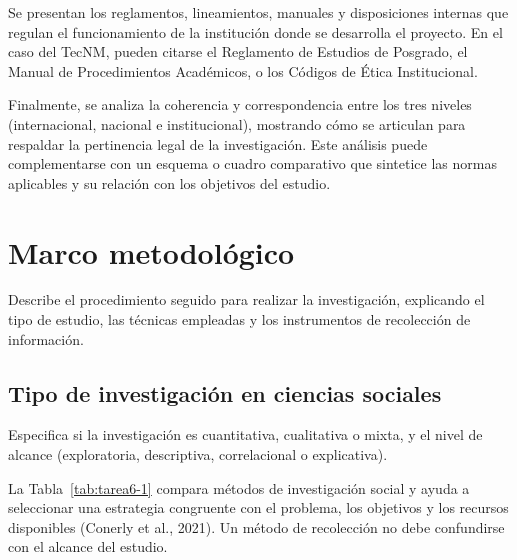Se presentan los reglamentos, lineamientos, manuales y disposiciones internas que regulan el funcionamiento de la institución donde se desarrolla el proyecto. En el caso del TecNM, pueden citarse el Reglamento de Estudios de Posgrado, el Manual de Procedimientos Académicos, o los Códigos de Ética Institucional.


Finalmente, se analiza la coherencia y correspondencia entre los tres niveles (internacional, nacional e institucional), mostrando cómo se articulan para respaldar la pertinencia legal de la investigación. Este análisis puede complementarse con un esquema o cuadro comparativo que sintetice las normas aplicables y su relación con los objetivos del estudio.

\clearpage\section{Marco metodológico}

Describe el procedimiento seguido para realizar la investigación, explicando el tipo de estudio, las técnicas empleadas y los instrumentos de recolección de información.

\subsection{Tipo de investigación en ciencias sociales}

Especifica si la investigación es cuantitativa, cualitativa o mixta, y el nivel de alcance (exploratoria, descriptiva, correlacional o explicativa).

La Tabla~\ref{tab:tarea6-1} compara métodos de investigación social y ayuda a seleccionar una estrategia congruente con el problema, los objetivos y los recursos disponibles (Conerly et al., 2021). Un método de recolección no debe confundirse con el alcance del estudio.

